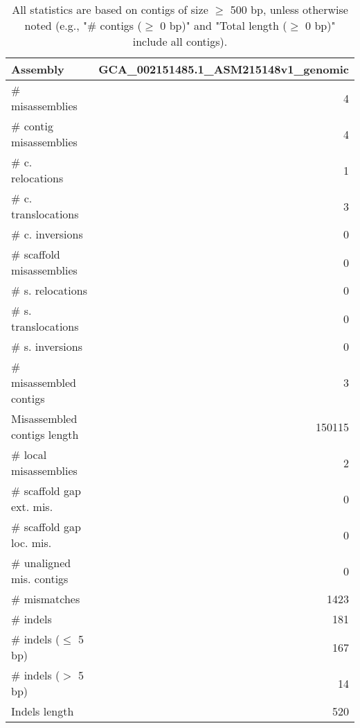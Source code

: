 \documentclass[12pt,a4paper]{article}
\begin{document}
\begin{table}[ht]
\begin{center}
\caption{All statistics are based on contigs of size $\geq$ 500 bp, unless otherwise noted (e.g., "\# contigs ($\geq$ 0 bp)" and "Total length ($\geq$ 0 bp)" include all contigs).}
\begin{tabular}{|l*{1}{|r}|}
\hline
Assembly & GCA\_002151485.1\_ASM215148v1\_genomic \\ \hline
\# misassemblies & 4 \\ \hline
\hspace{2mm}\# contig misassemblies & 4 \\ \hline
\hspace{5mm}\# c. relocations & 1 \\ \hline
\hspace{5mm}\# c. translocations & 3 \\ \hline
\hspace{5mm}\# c. inversions & 0 \\ \hline
\hspace{2mm}\# scaffold misassemblies & 0 \\ \hline
\hspace{5mm}\# s. relocations & 0 \\ \hline
\hspace{5mm}\# s. translocations & 0 \\ \hline
\hspace{5mm}\# s. inversions & 0 \\ \hline
\# misassembled contigs & 3 \\ \hline
Misassembled contigs length & 150115 \\ \hline
\# local misassemblies & 2 \\ \hline
\# scaffold gap ext. mis. & 0 \\ \hline
\# scaffold gap loc. mis. & 0 \\ \hline
\# unaligned mis. contigs & 0 \\ \hline
\# mismatches & 1423 \\ \hline
\# indels & 181 \\ \hline
\hspace{5mm}\# indels ($\leq$ 5 bp) & 167 \\ \hline
\hspace{5mm}\# indels ($>$ 5 bp) & 14 \\ \hline
Indels length & 520 \\ \hline
\end{tabular}
\end{center}
\end{table}
\end{document}

